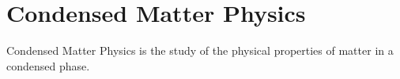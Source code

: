 \chapter{Condensed Matter Physics}
\thispagestyle{fancy}

Condensed Matter Physics is the study of the physical properties of matter in a condensed phase. 
